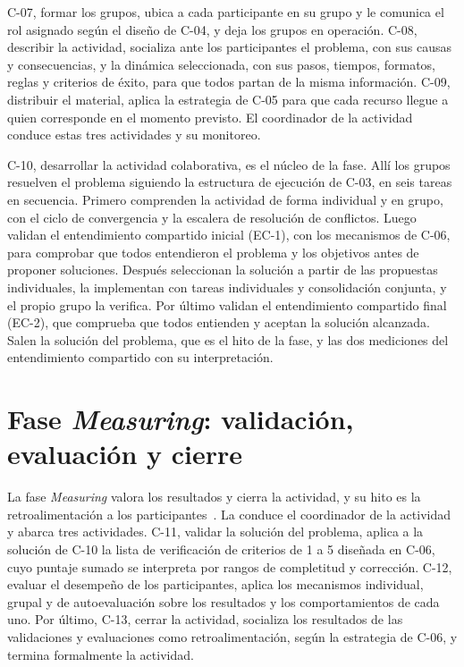 \documentclass[12pt,letterpaper,oneside]{report}
\begin{document}
C-07, formar los grupos, ubica a cada participante en su grupo y le comunica
el rol asignado según el diseño de C-04, y deja los grupos en operación. C-08,
describir la actividad, socializa ante los participantes el problema, con sus
causas y consecuencias, y la dinámica seleccionada, con sus pasos, tiempos,
formatos, reglas y criterios de éxito, para que todos partan de la misma
información. C-09, distribuir el material, aplica la estrategia de C-05 para
que cada recurso llegue a quien corresponde en el momento previsto. El
coordinador de la actividad conduce estas tres actividades y su monitoreo.

C-10, desarrollar la actividad colaborativa, es el núcleo de la fase. Allí los
grupos resuelven el problema siguiendo la estructura de ejecución de C-03, en
seis tareas en secuencia. Primero comprenden la actividad de forma individual y
en grupo, con el ciclo de convergencia y la escalera de resolución de
conflictos. Luego validan el entendimiento compartido inicial (EC-1), con los
mecanismos de C-06, para comprobar que todos entendieron el problema y los
objetivos antes de proponer soluciones. Después seleccionan la solución a
partir de las propuestas individuales, la implementan con tareas individuales
y consolidación conjunta, y el propio grupo la verifica. Por último validan el
entendimiento compartido final (EC-2), que comprueba que todos entienden y
aceptan la solución alcanzada. Salen la solución del problema, que es el hito de
la fase, y las dos mediciones del entendimiento compartido con su interpretación.

\section{Fase \textit{Measuring}: validación, evaluación y cierre}
\label{sec:base_measuring}
La fase \textit{Measuring} valora los resultados y cierra la actividad, y su
hito es la retroalimentación a los participantes~\cite{agredo2022thesis}. La
conduce el coordinador de la actividad y abarca tres actividades. C-11,
validar la solución del problema, aplica a la solución de C-10 la lista de
verificación de criterios de 1 a 5 diseñada en C-06, cuyo puntaje sumado se
interpreta por rangos de completitud y corrección. C-12, evaluar el desempeño
de los participantes, aplica los mecanismos individual, grupal y de
autoevaluación sobre los resultados y los comportamientos de cada uno. Por último, C-13,
cerrar la actividad, socializa los resultados de las validaciones y
evaluaciones como retroalimentación, según la estrategia de C-06, y termina
formalmente la actividad.
\end{document}
